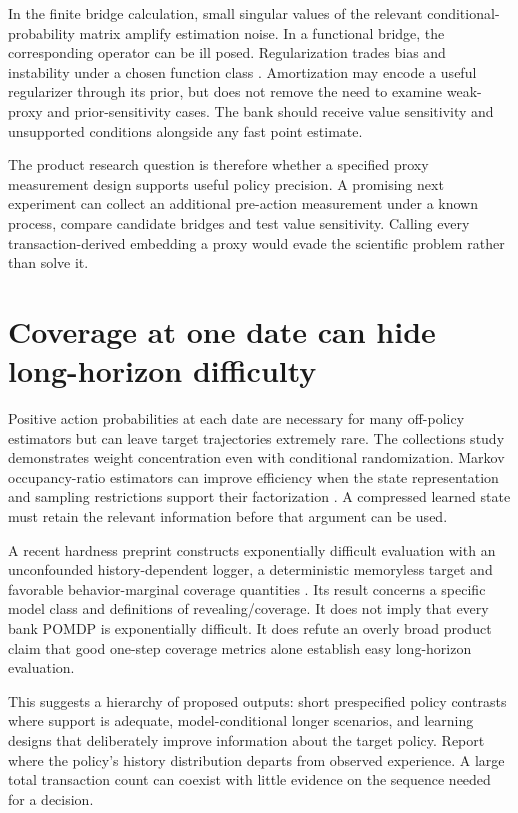 In the finite bridge calculation, small singular values of the relevant
conditional-probability matrix amplify estimation noise. In a functional
bridge, the corresponding operator can be ill posed. Regularization trades
bias and instability under a chosen function class
\citep{ghassami2022,proxreg2024}. Amortization may encode a useful
regularizer through its prior, but does not remove the need to examine
weak-proxy and prior-sensitivity cases. The bank should receive value
sensitivity and unsupported conditions alongside any fast point estimate.

The product research question is therefore whether a specified proxy
measurement design supports useful policy precision. A promising next
experiment can collect an additional pre-action measurement under a
known process, compare candidate bridges and test value sensitivity.
Calling every transaction-derived embedding a proxy would evade the
scientific problem rather than solve it.

\section{Coverage at one date can hide long-horizon difficulty}
Positive action probabilities at each date are necessary for many
off-policy estimators but can leave target trajectories extremely rare.
The collections study demonstrates weight concentration even with
conditional randomization. Markov occupancy-ratio estimators can improve
efficiency when the state representation and sampling restrictions support
their factorization \citep{kallus2020}. A compressed learned state must
retain the relevant information before that argument can be used.

A recent hardness preprint constructs exponentially difficult evaluation
with an unconfounded history-dependent logger, a deterministic memoryless
target and favorable behavior-marginal coverage quantities
\citep[Definition 3.1 and Theorem 4.1]{opehard2026}. Its result concerns
a specific model class and definitions of revealing/coverage. It does
not imply that every bank POMDP is exponentially difficult. It does
refute an overly broad product claim that good one-step coverage metrics
alone establish easy long-horizon evaluation.

This suggests a hierarchy of proposed outputs: short prespecified policy
contrasts where support is adequate, model-conditional longer scenarios,
and learning designs that deliberately improve information about the
target policy. Report where the policy's history distribution departs
from observed experience. A large total transaction count can coexist
with little evidence on the sequence needed for a decision.

